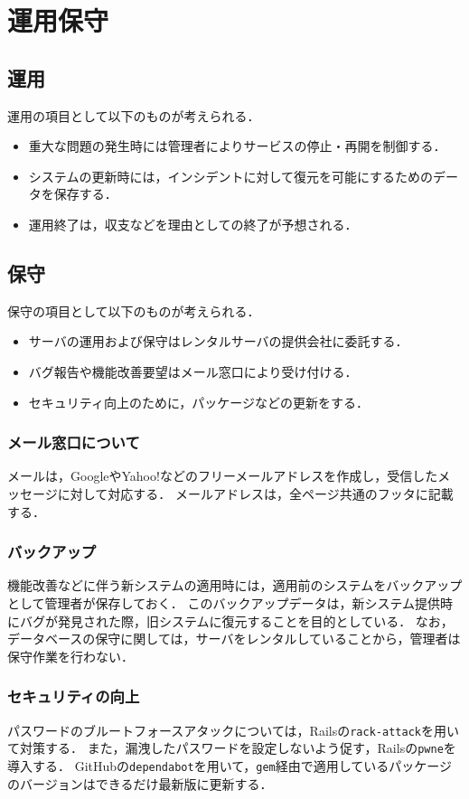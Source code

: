 \chapter{運用保守}
\section{運用}
運用の項目として以下のものが考えられる．
\begin{itemize}
    \item 重大な問題の発生時には管理者によりサービスの停止・再開を制御する．
    \item システムの更新時には，インシデントに対して復元を可能にするためのデータを保存する．
    \item 運用終了は，収支などを理由としての終了が予想される．
\end{itemize}
\section{保守}
保守の項目として以下のものが考えられる．
\begin{itemize}
    \item サーバの運用および保守はレンタルサーバの提供会社に委託する．
    \item バグ報告や機能改善要望はメール窓口により受け付ける．
    \item セキュリティ向上のために，パッケージなどの更新をする．
\end{itemize}
\subsection{メール窓口について}
メールは，GoogleやYahoo!などのフリーメールアドレスを作成し，受信したメッセージに対して対応する．
メールアドレスは，全ページ共通のフッタに記載する．
\subsection{バックアップ}
機能改善などに伴う新システムの適用時には，適用前のシステムをバックアップとして管理者が保存しておく．
このバックアップデータは，新システム提供時にバグが発見された際，旧システムに復元することを目的としている．
なお，データベースの保守に関しては，サーバをレンタルしていることから，管理者は保守作業を行わない．
\subsection{セキュリティの向上}
パスワードのブルートフォースアタックについては，Railsの\texttt{rack-attack}を用いて対策する．
また，漏洩したパスワードを設定しないよう促す，Railsの\texttt{pwne}を導入する．
GitHubの\texttt{dependabot}を用いて，\texttt{gem}経由で適用しているパッケージのバージョンはできるだけ最新版に更新する．
